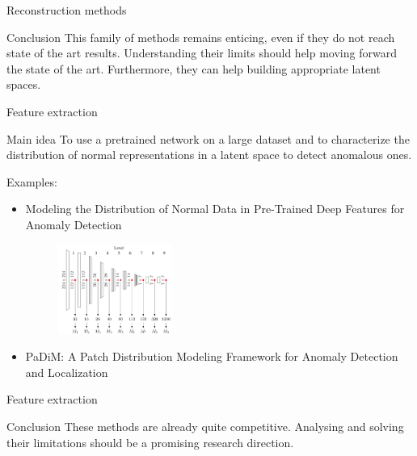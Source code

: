 \documentclass[xcolor=pdftex,dvipsnames,table,mathserif]{beamer}
\begin{document}
\begin{frame}{Reconstruction methods}

  \begin{block}{Conclusion}
    This family of methods remains enticing, even if they do not reach state of the art results. Understanding their limits should help moving forward the state of the art. Furthermore, they can help building appropriate latent spaces.
  \end{block}
\end{frame}


\begin{frame}{Feature extraction}

\begin{block}{Main idea}
To use a pretrained network on a large dataset and to characterize the distribution of normal representations in a latent space to detect anomalous ones.
\end{block}

Examples:
\begin{itemize}
\item Modeling the Distribution of Normal Data in Pre-Trained Deep Features for Anomaly Detection \cite{rippel_modeling_2020}
\begin{figure}[ht]
  \centering
  \includegraphics[width=0.35\textwidth]{enb0_features}
\end{figure}
\item PaDiM: A Patch Distribution Modeling Framework for Anomaly Detection and Localization \cite{defard_padim_2021}
\end{itemize}

\end{frame}

\begin{frame}{Feature extraction}

\begin{block}{Conclusion}
   These methods are already quite competitive. Analysing and solving their limitations should be a promising research direction.
\end{block}

\end{frame}
\end{document}
